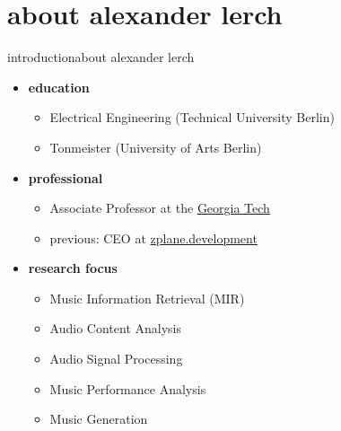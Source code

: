 

\subtitle{module 0.0: course introduction}


	

    \section[about]{about alexander lerch}
        \begin{frame}{introduction}{about alexander lerch}
            \begin{itemize}
                \item   \textbf{education}
                    \begin{itemize}
                        \item   Electrical Engineering (Technical University Berlin)
                        \item   Tonmeister (University of Arts Berlin)
                    \end{itemize}
        \smallskip
                \item   \textbf{professional}
                    \begin{itemize}
                        \item   Associate Professor at the \href{https://music.gatech.edu}{Georgia Tech}
                        \item   previous: CEO at \href{https://www.zplane.de}{zplane.development}
                    \end{itemize}
        \smallskip
                \item   \textbf{research focus}
                    \begin{itemize}
                        \item   Music Information Retrieval (MIR)
                        \item   Audio Content Analysis
                        \item   Audio Signal Processing
                        \item   Music Performance Analysis
                        \item   Music Generation
                    \end{itemize}
            \end{itemize}
            
        \end{frame}

